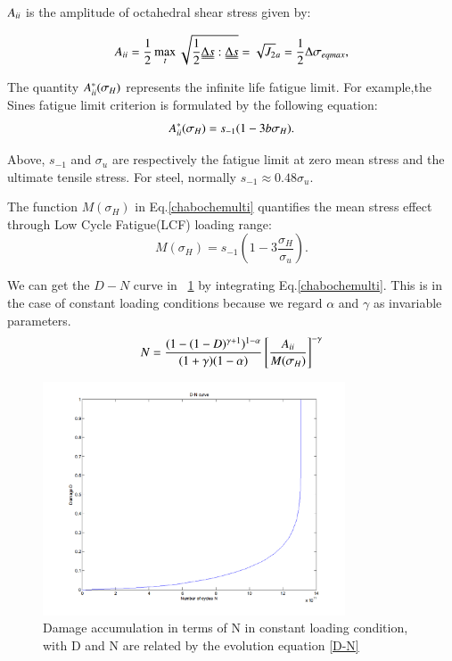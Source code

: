 \documentclass[3p,times,procedia,number]{elsarticle}
\newcommand{\figref}[1]{\figurename~\ref{#1}}
\begin{document}
$A_{\uppercase\expandafter{\romannumeral2}}$ is the amplitude of octahedral shear stress given by:

\begin{equation}A_{\uppercase\expandafter{\romannumeral2}}=\frac{1}{2}\max\limits_{t}\sqrt{\frac{1}{2}\uuline{\Delta s}:\uuline{\Delta s}}=\sqrt{J_2}_a=\frac{1}{2}\Delta\sigma_{eqmax},\end{equation}

The quantity $A_{\uppercase\expandafter{\romannumeral2}}^\ast(\sigma_H)$ represents the infinite life fatigue limit. For example,the Sines fatigue limit criterion is formulated by the following equation:
\begin{equation} A_{\uppercase\expandafter{\romannumeral2}}^\ast(\sigma_H)=s_{-1}(1-3b\sigma_H).\end{equation}

Above, $s_{-1}$ and $\sigma_{u}$ are respectively the fatigue limit at zero mean stress and the ultimate tensile stress. For steel, normally $s_{-1}\approx 0.48\sigma_{u}$.

The function $M(\sigma_H)$ in Eq.\eqref{chabochemulti} quantifies the mean stress effect through Low Cycle Fatigue(LCF) loading range:
$$M(\sigma_H)=s_{-1}\left(1-3\frac{\sigma_H}{\sigma_u}\right).$$

We can get the $D-N$ curve in \figref{DN} by integrating Eq.\eqref{chabochemulti}. This is in the case of constant loading conditions because we regard $\alpha$ and $\gamma$ as invariable parameters.
\begin{equation}N =\frac{( 1 -(1-D)^{\gamma+1})^{1-\alpha}}{(1+\gamma)(1-\alpha)}\left[\frac{A_{\uppercase\expandafter{\romannumeral2}}}{M(\sigma_H)}\right]^{-\gamma} 
\label{D-N}
\end{equation} 

\begin{figure}[h!]
	\centering
	\includegraphics[width=0.8\textwidth]{figures//D-N.png} 
	\caption{Damage accumulation in terms of N in constant loading condition, with D and N are related by the evolution equation \eqref{D-N}}
	\label{DN}
\end{figure}
\end{document}
